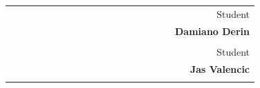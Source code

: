 \begin{titlepage}
\begin{center}
    \vfill
    \begin{table}[h]
        {\large
            \begin{tabular}{c c c c c c c c c c c c c c c c | c r}
                & & & & & & & & & & & & & & & & & Student \\
                & & & & & & & & & & & & & & & & & \bfseries Damiano Derin \\
                & & & & & & & & & & & & & & & & & \\
                & & & & & & & & & & & & & & & & & Student \\
                & & & & & & & & & & & & & & & & & \bfseries Jas Valencic \\
                & & & & & & & & & & & & & & & & & \\
                \hline
            \end{tabular}
        }
    \end{table}
    \vspace{1cm}
    \end{center}
\end{titlepage}

